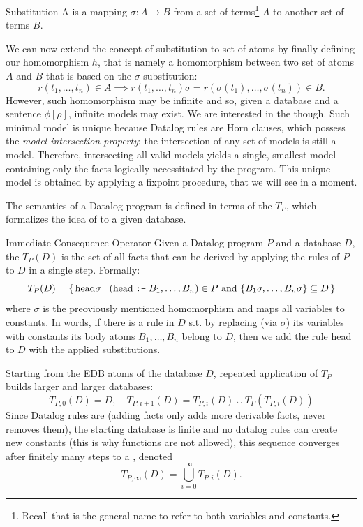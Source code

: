 \begin{definition}{Substitution}
    A  is a mapping \(\sigma: A \to B\) from a set of terms\footnote{Recall that  is the general name to refer to both variables and constants.} \(A\) to another set of terms \(B\).
\end{definition}
We can now extend the concept of substitution to set of atoms by finally defining our homomorphism \(h\), that is namely a homomorphism between two set of atoms \(A\) and \(B\) that is based on the \(\sigma\) substitution:
\[
    r(t_1,\ldots,t_n) \in A \implies r(t_1,\ldots,t_n)\sigma = r(\sigma(t_1),\ldots,\sigma(t_n)) \in B.
\]
However, such homomorphism may be infinite and so, given a database and a sentence \(\phi[\rho]\), infinite models may exist.
We are interested in the  though. Such minimal model is unique because Datalog rules are Horn clauses, which possess the \emph{model intersection property}: the intersection of any set of models is still a model. 
Therefore, intersecting all valid models yields a single, smallest model containing only the facts logically necessitated by the program.
This unique model is obtained by applying a fixpoint procedure, that we will see in a moment.

The semantics of a Datalog program is defined in terms of the  \(T_P\), which formalizes the idea of  to a given database.

\begin{definition}{Immediate Consequence Operator}
    Given a Datalog program \(P\) and a database \(D\), the  \(T_P(D)\) is the set of all facts that can be derived by applying the rules of \(P\) to \(D\) in a single step. Formally:
    \[
    T_P(D) = \{\, \text{head}\sigma \mid (\text{head} \;\text{\texttt{:-}}\; B_1, \dots, B_n) \in P \text{ and } \{B_1\sigma, \dots, B_n\sigma\} \subseteq D \,\}
    \]
    where \(\sigma\) is the preoviously mentioned homomorphism and maps all variables to constants.
    In words, if there is a rule in \(D\) s.t. by replacing (via \(\sigma\)) its variables with constants its body atoms \(B_1,\ldots,B_n\) belong to \(D\), then we add the rule head to \(D\) with the applied substitutions.
\end{definition}

Starting from the EDB atoms of the database \(D\), repeated application of \(T_P\) builds larger and larger databases:
\[
T_{P,0}(D) = D, \quad T_{P, i+1}(D) = T_{P, i}(D) \cup T_P(T_{P, i}(D))
\]
Since Datalog rules are  (adding facts only adds more derivable facts, never removes them), the starting database is finite and no datalog rules can create new constants (this is why functions are not allowed), this sequence converges after finitely many steps to a , denoted \[T_{P,\infty}(D)=\bigcup_{i=0}^{\infty}T_{P,i}(D).\]

